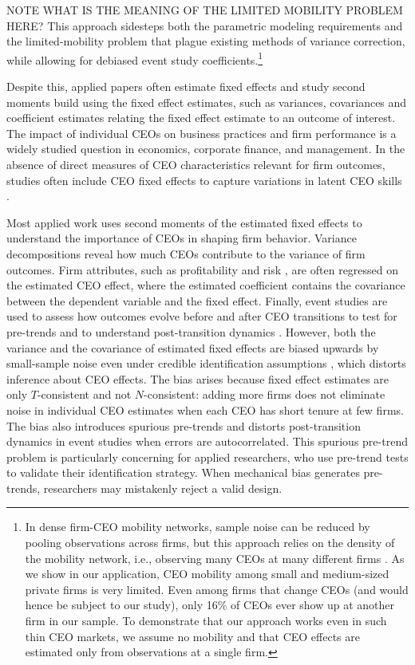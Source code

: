 \documentclass[11pt,a4paper]{article}
\begin{document}
NOTE WHAT IS THE MEANING OF THE LIMITED MOBILITY PROBLEM HERE? This approach sidesteps both the parametric modeling requirements and the limited-mobility problem that plague existing methods of variance correction, while allowing for debiased event study coefficients.\footnote{In dense firm-CEO mobility networks, sample noise can be reduced by pooling observations across firms, but this approach relies on the density of the mobility network, i.e., observing many CEOs at many different firms \citep{kline2020leave,kline2024firm}. As we show in our application, CEO mobility among small and medium-sized private firms is very limited. Even among firms that change CEOs (and would hence be subject to our study), only 16\% of CEOs ever show up at another firm in our sample. To demonstrate that our approach works even in such thin CEO markets, we assume no mobility and that CEO effects are estimated only from observations at a single firm.}



Despite this, applied papers often estimate fixed effects and study second moments build using the fixed effect estimates, such as variances, covariances and coefficient estimates relating the fixed effect estimate to an outcome of interest.
The impact of individual CEOs on business practices and firm performance is a widely studied question in economics, corporate finance, and management. In the absence of direct measures of CEO characteristics relevant for firm outcomes, studies often include CEO fixed effects to capture variations in latent CEO skills \citep{Bertrand2003-io, crossland2011differences, quigley2015has}. 

Most applied work uses second moments of the estimated fixed effects to understand the importance of CEOs in shaping firm behavior. Variance decompositions reveal how much CEOs contribute to the variance of firm outcomes. Firm attributes, such as profitability \citep{mackey2008effect} and risk \citep{schoar2024effect}, are often regressed on the estimated CEO effect, where the estimated coefficient contains the covariance between the dependent variable and the fixed effect. Finally, event studies are used to assess how outcomes evolve before and after CEO transitions to test for pre-trends and to understand post-transition dynamics \citep{schoar2024effect}. However, both the variance and the covariance of estimated fixed effects are biased upwards by small-sample noise even under credible identification assumptions
\citep{andrews2008high,gaure2014correlation,bonhomme2023much}, which distorts inference about CEO effects. The bias arises because fixed effect estimates are only $T$-consistent and not $N$-consistent: adding more firms does not eliminate noise in individual CEO estimates when each CEO has short tenure at few firms. The bias also introduces spurious pre-trends and distorts post-transition dynamics in event studies when errors are autocorrelated. This spurious pre-trend problem is particularly concerning for applied researchers, who use pre-trend tests to validate their identification strategy. When mechanical bias generates pre-trends, researchers may mistakenly reject a valid design.
\end{document}
